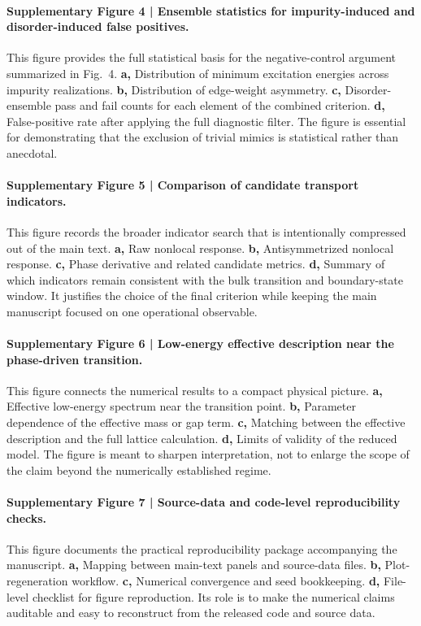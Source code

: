 \documentclass[11pt]{article}
\begin{document}
\paragraph{Supplementary Figure 4 | Ensemble statistics for impurity-induced and disorder-induced false positives.}
This figure provides the full statistical basis for the negative-control argument summarized in Fig.~4. \textbf{a,} Distribution of minimum excitation energies across impurity realizations. \textbf{b,} Distribution of edge-weight asymmetry. \textbf{c,} Disorder-ensemble pass and fail counts for each element of the combined criterion. \textbf{d,} False-positive rate after applying the full diagnostic filter. The figure is essential for demonstrating that the exclusion of trivial mimics is statistical rather than anecdotal.

\paragraph{Supplementary Figure 5 | Comparison of candidate transport indicators.}
This figure records the broader indicator search that is intentionally compressed out of the main text. \textbf{a,} Raw nonlocal response. \textbf{b,} Antisymmetrized nonlocal response. \textbf{c,} Phase derivative and related candidate metrics. \textbf{d,} Summary of which indicators remain consistent with the bulk transition and boundary-state window. It justifies the choice of the final criterion while keeping the main manuscript focused on one operational observable.

\paragraph{Supplementary Figure 6 | Low-energy effective description near the phase-driven transition.}
This figure connects the numerical results to a compact physical picture. \textbf{a,} Effective low-energy spectrum near the transition point. \textbf{b,} Parameter dependence of the effective mass or gap term. \textbf{c,} Matching between the effective description and the full lattice calculation. \textbf{d,} Limits of validity of the reduced model. The figure is meant to sharpen interpretation, not to enlarge the scope of the claim beyond the numerically established regime.

\paragraph{Supplementary Figure 7 | Source-data and code-level reproducibility checks.}
This figure documents the practical reproducibility package accompanying the manuscript. \textbf{a,} Mapping between main-text panels and source-data files. \textbf{b,} Plot-regeneration workflow. \textbf{c,} Numerical convergence and seed bookkeeping. \textbf{d,} File-level checklist for figure reproduction. Its role is to make the numerical claims auditable and easy to reconstruct from the released code and source data.
\end{document}
